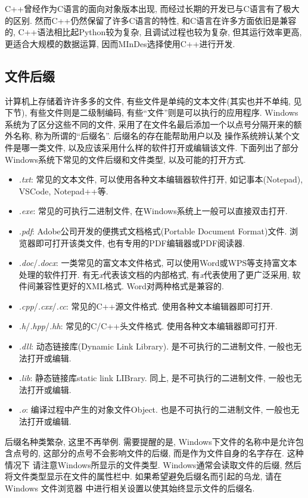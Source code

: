 C++曾经作为C语言的面向对象版本出现, 而经过长期的开发已与C语言有了极大的区别. 然而C++仍然保留了许多C语言的特性, 和C语言在许多方面依旧是兼容的,
C++语法相比起Python较为复杂, 且调试过程也较为复杂, 但其运行效率更高, 更适合大规模的数据运算, 因而MInDes选择使用C++进行开发.

\subsection{文件后缀}
计算机上存储着许许多多的文件, 有些文件是单纯的文本文件(其实也并不单纯, 见下节), 有些文件则是二级制编码, 有些``文件''则是可以执行的应用程序.
Windows系统为了区分这些不同的文件, 采用了在文件名最后添加一个以点号分隔开来的额外名称, 称为所谓的``后缀名''. 后缀名的存在能帮助用户以及
操作系统辨认某个文件是哪一类文件, 以及应该采用什么样的软件打开或编辑该文件. 下面列出了部分Windows系统下常见的文件后缀和文件类型, 以及可能的打开方式.
\begin{itemize}
    \item \emph{.txt}: 常见的文本文件, 可以使用各种文本编辑器软件打开, 如记事本(Notepad), VSCode, Notepad++等.
    \item \emph{.exe}: 常见的可执行二进制文件, 在Windows系统上一般可以直接双击打开.
    \item \emph{.pdf}: Adobe公司开发的便携式文档格式(Portable Document Format)文件. 浏览器即可打开该类文件, 也有专用的PDF编辑器或PDF阅读器.
    \item \emph{.doc}/\emph{.docx}: 一类常见的富文本文件格式, 可以使用Word或WPS等支持富文本处理的软件打开. 
    有无\emph{x}代表该文档的内部格式, 有\emph{x}代表使用了更广泛采用, 软件间兼容性更好的XML格式. Word对两种格式是兼容的.
    \item \emph{.cpp}/\emph{.cxx}/\emph{.cc}: 常见的C++源文件格式. 使用各种文本编辑器即可打开.
    \item \emph{.h}/\emph{.hpp}/\emph{.hh}: 常见的C/C++头文件格式. 使用各种文本编辑器即可打开.
    \item \emph{.dll}: 动态链接库(Dynamic Link Library). 是不可执行的二进制文件, 一般也无法打开或编辑.
    \item \emph{.lib}: 静态链接库{static link LIBrary}. 同上, 是不可执行的二进制文件, 一般也无法打开或编辑.
    \item \emph{.o}: 编译过程中产生的对象文件{Object}. 也是不可执行的二进制文件, 一般也无法打开或编辑.
\end{itemize}
后缀名种类繁杂, 这里不再举例. 需要提醒的是, Windows下文件的名称中是允许包含点号的, 这部分的点号不会影响文件的后缀, 而是作为文件自身的名字存在. 这种情况下
请注意Windows所显示的文件类型. Windows通常会读取文件的后缀, 然后将文件类型显示在文件的属性栏中. 如果希望避免后缀名而引起的乌龙, 请在Windows 文件浏览器
中进行相关设置以使其始终显示文件的后缀名.

